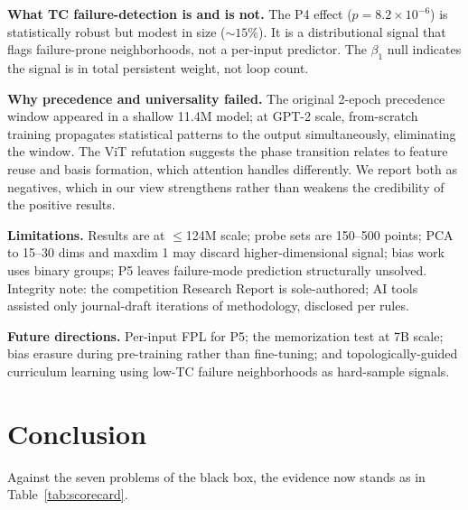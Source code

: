\documentclass[10pt]{article}
\begin{document}
\textbf{What TC failure-detection is and is not.} The P4 effect ($p=8.2\times10^{-6}$) is statistically robust but modest in size (${\sim}15\%$). It is a distributional signal that flags failure-prone neighborhoods, not a per-input predictor. The $\beta_1$ null indicates the signal is in total persistent weight, not loop count.

\textbf{Why precedence and universality failed.} The original 2-epoch precedence window appeared in a shallow 11.4M model; at GPT-2 scale, from-scratch training propagates statistical patterns to the output simultaneously, eliminating the window. The ViT refutation suggests the phase transition relates to feature reuse and basis formation, which attention handles differently. We report both as negatives, which in our view strengthens rather than weakens the credibility of the positive results.

\textbf{Limitations.} Results are at $\le$124M scale; probe sets are 150--500 points; PCA to 15--30 dims and maxdim 1 may discard higher-dimensional signal; bias work uses binary groups; P5 leaves failure-mode prediction structurally unsolved. Integrity note: the competition Research Report is sole-authored; AI tools assisted only journal-draft iterations of methodology, disclosed per rules.

\textbf{Future directions.} Per-input FPL for P5; the memorization test at 7B scale; bias erasure during pre-training rather than fine-tuning; and topologically-guided curriculum learning using low-TC failure neighborhoods as hard-sample signals.

\section{Conclusion}

Against the seven problems of the black box, the evidence now stands as in Table~\ref{tab:scorecard}.
\end{document}
